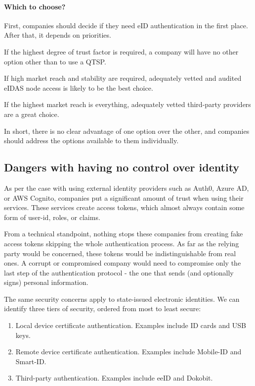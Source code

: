 \paragraph{Which to choose?} First, companies should decide if they need eID authentication in the first place. After that, it depends on priorities.

If the highest degree of trust factor is required, a company will have no other option other than to use a QTSP.

If high market reach and stability are required, adequately vetted and audited eIDAS node access is likely to be the best choice.

If the highest market reach is everything, adequately vetted third-party providers are a great choice.

In short, there is no clear advantage of one option over the other, and companies should address the options available to them individually.

\subsection{Dangers with having no control over identity}

As per the case with using external identity providers such as Auth0, Azure AD, or AWS Cognito, companies put a significant amount of trust when using their services. These services create access tokens, which almost always contain some form of user-id, roles, or claims.

From a technical standpoint, nothing stops these companies from creating fake access tokens skipping the whole authentication process. As far as the relying party would be concerned, these tokens would be indistinguishable from real ones. A corrupt or compromised company would need to compromise only the last step of the authentication protocol - the one that sends (and optionally signs) personal information.

The same security concerns apply to state-issued electronic identities. We can identify three tiers of security, ordered from most to least secure:

\begin{enumerate}
    \item Local device certificate authentication. Examples include ID cards and USB keys.
    \item Remote device certificate authentication. Examples include Mobile-ID and Smart-ID.
    \item Third-party authentication. Examples include eeID and Dokobit.
\end{enumerate}

